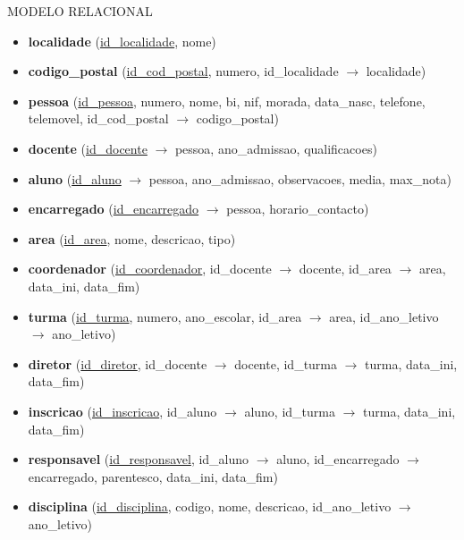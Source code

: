 \documentclass[12pt,a4paper,reqno]{report}
\numberwithin{figure}{section}
\numberwithin{equation}{section}
\begin{document}
MODELO RELACIONAL

\begin{itemize}

\item \textbf{localidade} (\underline{id\_localidade}, nome)

\item \textbf{codigo\_postal} (\underline {id\_cod\_postal}, numero, id\_localidade $\rightarrow$ localidade)

\item \textbf{pessoa} (\underline{id\_pessoa}, numero, nome, bi, nif, morada, data\_nasc, telefone, telemovel, id\_cod\_postal $\rightarrow$ codigo\_postal)

\item \textbf{docente} (\underline{id\_docente} $\rightarrow$ pessoa, ano\_admissao, qualificacoes)

\item \textbf{aluno} (\underline{id\_aluno} $\rightarrow$ pessoa, ano\_admissao, observacoes, media, max\_nota)

\item \textbf{encarregado} (\underline{id\_encarregado} $\rightarrow$ pessoa, horario\_contacto)

\item \textbf{area} (\underline{id\_area}, nome, descricao, tipo)

\item \textbf{coordenador} (\underline{id\_coordenador}, id\_docente $\rightarrow$ docente, id\_area $\rightarrow$ area, data\_ini, data\_fim)

\item \textbf{turma} (\underline{id\_turma}, numero, ano\_escolar, id\_area $\rightarrow$ area, id\_ano\_letivo $\rightarrow$ ano\_letivo)

\item \textbf{diretor} (\underline{id\_diretor}, id\_docente $\rightarrow$ docente, id\_turma $\rightarrow$ turma, data\_ini, data\_fim)

\item \textbf{inscricao} (\underline{id\_inscricao}, id\_aluno $\rightarrow$ aluno, id\_turma $\rightarrow$ turma, data\_ini, data\_fim)

\item \textbf{responsavel} (\underline{id\_responsavel}, id\_aluno $\rightarrow$ aluno, id\_encarregado $\rightarrow$ encarregado, parentesco, data\_ini, data\_fim)

\item \textbf{disciplina} (\underline{id\_disciplina}, codigo, nome, descricao, id\_ano\_letivo $\rightarrow$ ano\_letivo)


\end{itemize}
\end{document}
